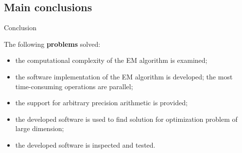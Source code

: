 \subsection*{Main conclusions}

\begin{frame}{Conclusion}

The following \textbf{problems} solved:
\begin{itemize}
\item the computational complexity of the EM algorithm is examined;
\item the software implementation of the EM algorithm is developed; the most time-consuming operations are parallel;
\item the support for arbitrary precision arithmetic is provided;
\item the developed software is used to find solution for optimization problem of large dimension;
\item the developed software is inspected and tested.
\end{itemize}

\end{frame}